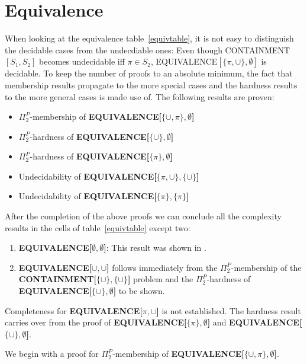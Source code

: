 \section{Equivalence}
When looking at the equivalence table~\ref{equivtable}, it is not easy to
distinguish the decidable cases from the undecdiable ones: Even though CONTAINMENT$[S_1,S_2]$ becomes
undecidable iff $\pi \in S_2$, EQUIVALENCE$[\{\pi,\cup\},\emptyset]$
is decidable. To keep the number of proofs to an absolute minimum, the
fact that membership results propagate to the more special cases and the hardness
results to the more general cases is made use of.
The following results are proven:
\begin{itemize}
	\item $\Pi^P_2$-membership of \textbf{EQUIVALENCE[$\{\cup,\pi\},\emptyset$]}
	\item $\Pi^P_2$-hardness of \textbf{EQUIVALENCE[$\{\cup\},\emptyset$]}
	\item $\Pi^P_2$-hardness of \textbf{EQUIVALENCE[$\{\pi\},\emptyset$]}
	\item Undecidability of \textbf{EQUIVALENCE[$\{\pi,\cup \},\{\cup \}$]}
	\item Undecidability of \textbf{EQUIVALENCE[$\{\pi\},\{\pi\}$]}
\end{itemize}

After the completion of the above proofs we can conclude all the complexity results in the cells of table~\ref{equivtable}
except two:
\begin{enumerate}
	\item \textbf{EQUIVALENCE[$\emptyset,\emptyset$]}: This result was shown in
\cite{letelier2012static}. 
\item \textbf{EQUIVALENCE[$\cup,\cup$]} follows immediately from the $\Pi^P_2$-membership
	of the \textbf{CONTAINMENT[$\{\cup\}, \{\cup\}$]} problem and the $\Pi^P_2$-hardness of
	\textbf{EQUIVALENCE[$\{\cup\}, \emptyset$]} to be shown.
\end{enumerate}
Completeness for \textbf{EQUIVALENCE[$\pi,\cup$]} is not established. The hardness result
carries over from the proof of \textbf{EQUIVALENCE[$\{\pi\},\emptyset$]} and
\textbf{EQUIVALENCE[$\{\cup\},\emptyset$]}.

We begin with a proof for $\Pi^P_2$-membership of
\textbf{EQUIVALENCE[$\{\cup,\pi\},\emptyset$]}. 

